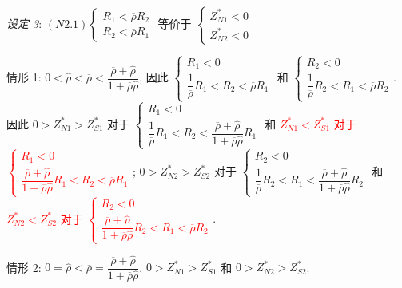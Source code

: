\documentclass[10.0pt]{article}
\newcommand{\hhred}{\textcolor{red}}
\begin{document}
{\it 设定 3}: $ (N2.1) \left\{ \begin{matrix} R_1 < \overline{\rho} R_2 \\ R_2 < \overline{\rho} R_1 \end{matrix} \right. $ 等价于 $ \left\{ \begin{matrix} Z_{N 1}^* < 0 \\ Z_{N 2}^* < 0 \end{matrix} \right. $

情形 1: $ 0 < {\hat \rho} < \overline{\rho} < \dfrac{\overline{\rho} + {\hat \rho}}{1 + \overline{\rho} {\hat \rho}} $, 
因此 $ \left\{ \begin{matrix} R_1 < 0 \\ \dfrac{1}{\overline{\rho}} R_1 < R_2 < \overline{\rho} R_1 \end{matrix} \right. $ 和 $ \left\{ \begin{matrix} R_2 < 0 \\ \dfrac{1}{\overline{\rho}} R_2 < R_1 < \overline{\rho} R_2 \end{matrix} \right. $.
因此 $ 0 > Z_{N 1}^* > Z_{S 1}^* $ 对于 $ \left\{ \begin{matrix} R_1 < 0 \\ \dfrac{1}{\overline{\rho}} R_1 < R_2 < \dfrac{\overline{\rho} + {\hat \rho}}{1 + \overline{\rho} {\hat \rho}} R_1 \end{matrix} \right. $ 和 \hhred{$ Z_{N 1}^* < Z_{S 1}^* $ 对于 $ \left\{ \begin{matrix} R_1 < 0 \\ \dfrac{\overline{\rho} + {\hat \rho}}{1 + \overline{\rho} {\hat \rho}} R_1 < R_2 < \overline{\rho} R_1 \end{matrix} \right. $}; 
$ 0 > Z_{N 2}^* > Z_{S 2}^* $ 对于 $ \left\{ \begin{matrix} R_2 < 0 \\ \dfrac{1}{\overline{\rho}} R_2 < R_1 < \dfrac{\overline{\rho} + {\hat \rho}}{1 + \overline{\rho} {\hat \rho}} R_2 \end{matrix} \right. $ 和 \hhred{$ Z_{N 2}^* < Z_{S 2}^* $ 对于 $ \left\{ \begin{matrix} R_2 < 0 \\ \dfrac{\overline{\rho} + {\hat \rho}}{1 + \overline{\rho} {\hat \rho}} R_2 < R_1 < \overline{\rho} R_2 \end{matrix} \right. $}.

情形 2: $ 0 = {\hat \rho} < \overline{\rho} = \dfrac{\overline{\rho} + {\hat \rho}}{1 + \overline{\rho} {\hat \rho}} $, $ 0 > Z_{N 1}^* > Z_{S 1}^* $ 和 $ 0 > Z_{N 2}^* > Z_{S 2}^* $.
\end{document}
